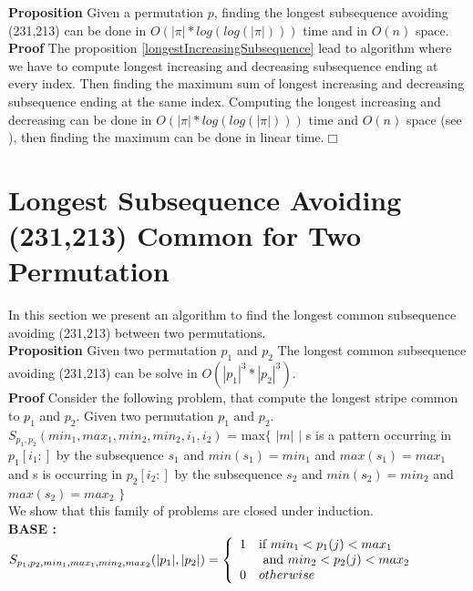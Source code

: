 \documentclass[12pt, a4paper]{article}
\newcommand{\ptext}{\pi}
\newcounter{num}
\newcommand{\num}{\stepcounter{num} }
\begin{document}
	\textbf{Proposition  \num \thenum}
	Given a permutation $p$, 
	finding the longest subsequence avoiding (231,213)
	can be done in $O(|\ptext|*log(log(|\ptext|)))$ time and in $O(n)$ space.\\
	
	\textbf{Proof} The proposition \ref{longestIncreasingSubsequence} lead to algorithm 
	where we have to compute longest increasing and decreasing subsequence ending at every index. Then finding the maximum sum of longest increasing and decreasing subsequence ending at the same index.
	Computing the longest increasing and decreasing can be done in $O(|\ptext|*log(log(|\ptext|)))$ time and $O(n)$ space (see \cite{Bespamyatnikh00enumeratinglongest}), then finding the maximum can be done in linear time.$\Box$\\



	\section{Longest Subsequence Avoiding \\(231,213) Common for Two Permutation}
	
	In this section we present an algorithm to find 
	the longest common subsequence avoiding (231,213) 
	between two permutations.\\
	
	\textbf{Proposition \num \thenum } Given two permutation $p_1$ and $p_2$
	The longest common subsequence
	avoiding (231,213) can be solve in $O(|p_1|^3*|p_2|^3)$.\\
	
	\textbf{Proof } Consider the following problem, 
	that compute the longest stripe common to $p_1$ and $p_2$.
	Given two permutation $p_1$ and $p_2$.\\
	
	$S_{p_1,p_2}(min_1,max_1,min_2,min_2,i_1,i_2)$
	= max$\{$ $|m|$ $|$ 
	s is a pattern occurring 
	in  $p_1[i_1:]$
	by the subsequence $s_1$ and $min(s_1)=min_1$ and $max(s_1)=max_1$
	and s is occurring
	in  $p_2[i_2:]$
	by the subsequence $s_2$ and $min(s_2)=min_2$ and $max(s_2)=max_2$	
	$\}$\\
	
	We show that this family of problems are closed under induction.\\


	\textbf{BASE :} \\
	$S_{p_1,p_2,min_1,max_1,min_2,max_2}(|p_1|,|p_2|) = \left\{ 
			\begin{array}{l l}
				1 & \text{if $min_1<p_1(j)<max_1$  
				}\\
				& \text{ and $min_2<p_2(j)<max_2$}\\
				0 & otherwise\\
			\end{array} \right. $\\	
\end{document}

